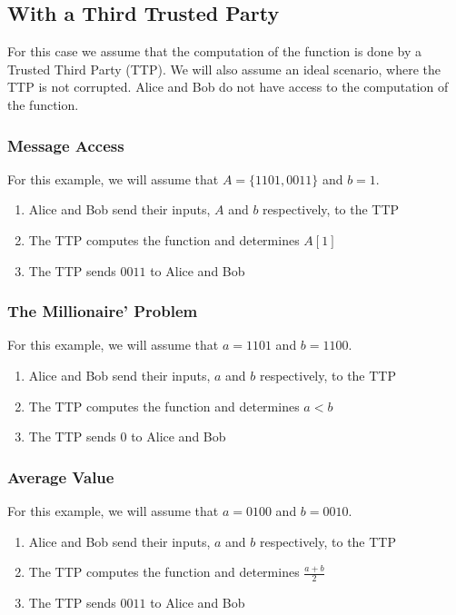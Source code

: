 \subsection{With a Third Trusted Party}
For this case we assume that the computation of the function is done by a Trusted Third Party (TTP). 
We will also assume an ideal scenario, where the TTP is not corrupted.
Alice and Bob do not have access to the computation of the function.


\subsubsection{Message Access}
For this example, we will assume that $A = \{1101,0011\}$ and $b = 1$.
\begin{enumerate}
\item Alice and Bob send their inputs, $A$ and $b$ respectively, to the TTP
\item The TTP computes the function and determines $A[1]$
\item The TTP sends $0011$ to Alice and Bob
\end{enumerate}

\subsubsection{The Millionaire' Problem}
For this example, we will assume that $a = 1101$ and $b = 1100$.
\begin{enumerate}
\item Alice and Bob send their inputs, $a$ and $b$ respectively, to the TTP
\item The TTP computes the function and determines $a < b$
\item The TTP sends $0$ to Alice and Bob
\end{enumerate}

\subsubsection{Average Value}
For this example, we will assume that $a = 0100$ and $b = 0010$.
\begin{enumerate}
\item Alice and Bob send their inputs, $a$ and $b$ respectively, to the TTP
\item The TTP computes the function and determines $\frac{a+b}{2}$
\item The TTP sends $0011$ to Alice and Bob
\end{enumerate}

